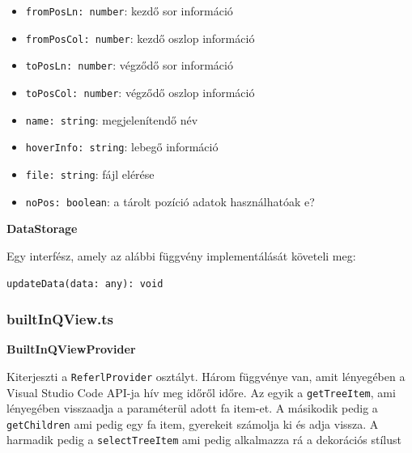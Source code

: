 \begin{itemize}
    \item \lstinline{fromPosLn: number}: kezdő sor információ
    
    \item \lstinline{fromPosCol: number}: kezdő oszlop információ
    
    \item \lstinline{toPosLn: number}: végződő sor információ
    
     \item \lstinline{toPosCol: number}: végződő oszlop információ
    
    \item \lstinline{name: string}: megjelenítendő név
    
    \item \lstinline{hoverInfo: string}: lebegő információ
    
     \item \lstinline{file: string}: fájl elérése
    
    \item \lstinline{noPos: boolean}: a tárolt pozíció adatok használhatóak e?

\end{itemize}








\vspace{14pt}
\noindent \textbf{DataStorage}


\noindent Egy interfész, amely az alábbi függvény implementálását követeli meg:

\noindent\lstinline{updateData(data: any): void}




\subsubsection{builtInQView.ts}



\vspace{14pt}
\noindent \textbf{BuiltInQViewProvider}


\noindent Kiterjeszti a \lstinline{ReferlProvider} osztályt. Három függvénye van, amit lényegében a Visual Studio Code API-ja hív meg időről időre. Az egyik a \lstinline{getTreeItem}, ami lényegében visszaadja a paraméterül adott fa item-et. A másikodik pedig a \lstinline{getChildren} ami pedig egy fa item, gyerekeit számolja ki és adja vissza. A harmadik pedig a \lstinline{selectTreeItem} ami pedig alkalmazza rá a dekorációs stílust









